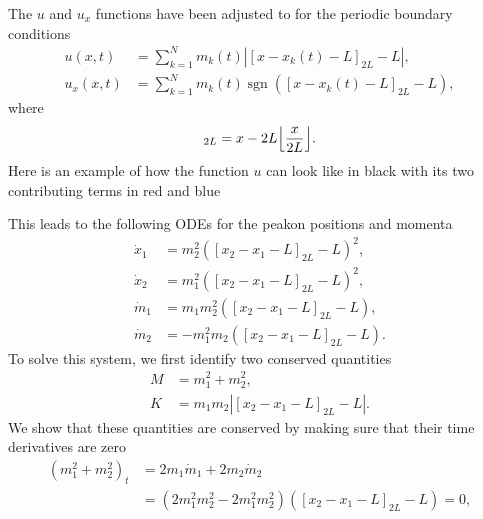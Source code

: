 \documentclass[english,master]{liumaiex}
\theoremstyle{plain}
\theoremstyle{definition}
\DeclareMathOperator{\sgn}{sgn}
\DeclarePairedDelimiter\floor{\lfloor}{\rfloor}
\begin{document}
The $u$ and $u_x$ functions have been adjusted to for the periodic boundary conditions
\begin{equation} \label{eq:periodic_ansatz}
\begin{aligned}
	u(x, t) &= \sum_{k = 1}^{N} m_k(t) |[x - x_k(t) - L]_{2L} - L|, \\
	u_x(x, t) &= \sum_{k = 1}^{N} m_k(t) \sgn([x - x_k(t) - L]_{2L} - L),
\end{aligned}
\end{equation}
where
\begin{equation}
	[x]_{2L} = x - 2L\floor*{\frac{x}{2L}}.
\end{equation}
%
Here is an example of how the function $u$ can look like in black with its two contributing terms in red and blue
\begin{center}
\end{center}
%
This leads to the following ODEs for the peakon positions and momenta
%
\begin{align}
	\dot{x}_1 & = m_2^2 ([x_2 - x_1 - L]_{2L} - L)^2, \\
	\dot{x}_2 & = m_1^2 ([x_2 - x_1 - L]_{2L} - L)^2, \\
	\dot{m}_1 & = m_1 m_2^2([x_2 - x_1 - L]_{2L} - L),  \\
	\dot{m}_2 & = -m_1^2 m_2([x_2 - x_1 - L]_{2L} - L).
\end{align}
%
To solve this system, we first identify two conserved quantities
\begin{align}
	M &= m_1^2 + m_2^2, \\
	K &= m_1m_2|[x_2 - x_1 - L]_{2L} - L|.
\end{align}
%
We show that these quantities are conserved by making sure that their time derivatives are zero
\begin{equation}
\begin{aligned}
	(m_1^2 + m_2^2)_t 
	&= 2m_1\dot{m}_1 + 2m_2\dot{m}_2 \\
	&= (2m_1^2m_2^2 - 2m_1^2m_2^2)([x_2 - x_1 - L]_{2L} - L) = 0,
\end{aligned}
\end{equation}
\end{document}
